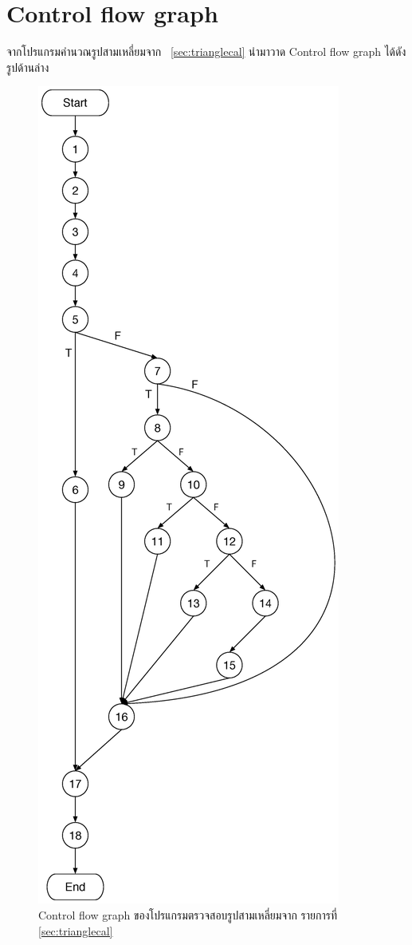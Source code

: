 \documentclass[12pt,a4paper]{article}
\renewcommand{\lstlistingname}{รายการที่}
\begin{document}
\newpage
\clearpage
\section{Control flow graph}
จากโปรแกรมคำนวณรูปสามเหลี่ยมจาก \numbername~\ref{sec:trianglecal} นำมาวาด Control flow graph ได้ดังรูปด้านล่าง

\begin{figure}[h!]
    \label{fig:flowgraph}
    \centering
    \includegraphics[height=0.8\textheight]{img/graph-testing-pythagorus.eps}
    \caption{Control flow graph ของโปรแกรมตรวจสอบรูปสามเหลี่ยมจาก \lstlistingname\, \ref{sec:trianglecal}}
\end{figure}
\end{document}
